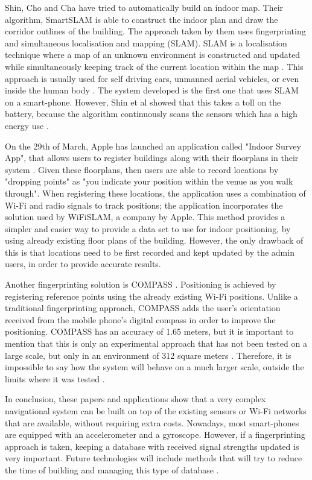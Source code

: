 Shin, Cho and Cha have tried to automatically build an indoor map. Their algorithm, SmartSLAM \cite{wifi-map} is able to construct the indoor plan and draw the corridor outlines of the building. The approach taken by them uses fingerprinting and simultaneous localisation and mapping (SLAM). SLAM is a localisation technique where a map of an unknown environment is constructed and updated while simultaneously keeping track of the current location within the map \cite{SLAM}. This approach is usually used for self driving cars, unmanned aerial vehicles, or even inside the human body \cite{SLAM-auto}. The system developed is the first one that uses SLAM on a smart-phone. However, Shin et al showed that this takes a toll on the battery, because the algorithm continuously scans the sensors which has a high energy use \cite{wifi-map}.

On the 29th of March, Apple has launched an application called "Indoor Survey App", that allows users to register buildings along with their floorplans in their system \cite{apple-indoor-survey}. Given these floorplans, then users are able to record locations by "dropping points" as "you indicate your position within the venue as you walk through". When registering these locations, the application uses a combination of Wi-Fi and radio signals to track positions; the application incorporates the solution used by WiFiSLAM, a company by Apple. This method provides a simpler and easier way to provide a data set to use for indoor positioning, by using already existing floor plans of the building. However, the only drawback of this is that locations need to be first recorded and kept updated by the admin users, in order to provide accurate results.

Another fingerprinting solution is COMPASS \cite{compass}. Positioning is achieved by registering reference points using the already existing Wi-Fi positions. Unlike a traditional fingerprinting approach, COMPASS adds the user's orientation received from the mobile phone's digital compass in order to improve the positioning. COMPASS has an accuracy of 1.65 meters, but it is important to mention that this is only an experimental approach that has not been tested on a large scale, but only in an environment of 312 square meters  \cite{compass}. Therefore, it is impossible to say how the system will behave on a much larger scale, outside the limits where it was tested \cite{compass}.

In conclusion, these papers and applications show that a very complex navigational system can be built on top of the existing sensors or Wi-Fi networks that are available, without requiring extra costs. Nowadays, most smart-phones are equipped with an accelerometer and a gyroscope. However, if a fingerprinting approach is taken, keeping a database with received signal strengths updated is very important. Future technologies will include methods that will try to reduce the time of building and managing this type of database \cite{wifi-explore-paper}.
